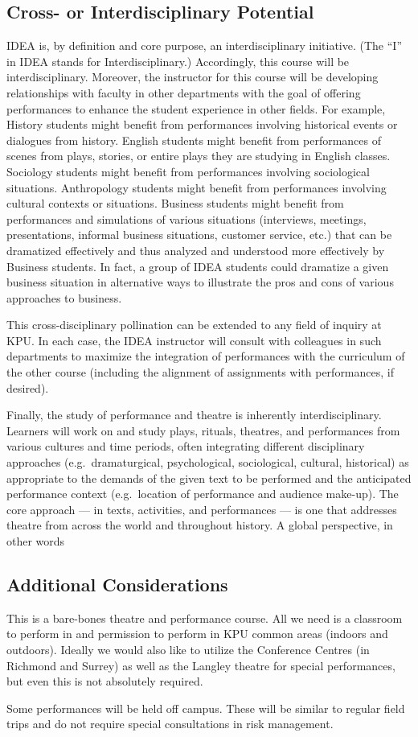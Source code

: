 \documentclass[letterpaper,10pt,headsepline]{scrreprt}
\begin{document}
\subsection{Cross- or Interdisciplinary Potential}

IDEA is, by definition and core purpose, an interdisciplinary
initiative. (The ``I'' in IDEA stands for Interdisciplinary.)
Accordingly, this course will be interdisciplinary. Moreover, the
instructor for this course will be developing relationships with faculty
in other departments with the goal of offering performances to enhance
the student experience in other fields. For example, History students
might benefit from performances involving historical events or dialogues
from history. English students might benefit from performances of scenes
from plays, stories, or entire plays they are studying in English
classes. Sociology students might benefit from performances involving
sociological situations. Anthropology students might benefit from
performances involving cultural contexts or situations. Business
students might benefit from performances and simulations of various
situations (interviews, meetings, presentations, informal business
situations, customer service, etc.) that can be dramatized effectively
and thus analyzed and understood more effectively by Business students.
In fact, a group of IDEA students could dramatize a given business
situation in alternative ways to illustrate the pros and cons of various
approaches to business.

This cross-disciplinary pollination can be extended to any field of
inquiry at KPU. In each case, the IDEA instructor will consult with
colleagues in such departments to maximize the integration of
performances with the curriculum of the other course (including the
alignment of assignments with performances, if desired).

Finally, the study of performance and theatre is inherently
interdisciplinary. Learners will work on and study plays, rituals,
theatres, and performances from various cultures and time periods, often
integrating different disciplinary approaches (e.g.~dramaturgical,
psychological, sociological, cultural, historical) as appropriate to the
demands of the given text to be performed and the anticipated
performance context (e.g.~location of performance and audience make-up).
The core approach --- in texts, activities, and performances --- is one
that addresses theatre from across the world and throughout history. A
global perspective, in other words

\subsection{Additional Considerations}

This is a bare-bones theatre and performance course. All we need is a
classroom to perform in and permission to perform in KPU common areas
(indoors and outdoors). Ideally we would also like to utilize the
Conference Centres (in Richmond and Surrey) as well as the Langley
theatre for special performances, but even this is not absolutely
required.

Some performances will be held off campus. These will be similar to
regular field trips and do not require special consultations in risk
management.
\end{document}
